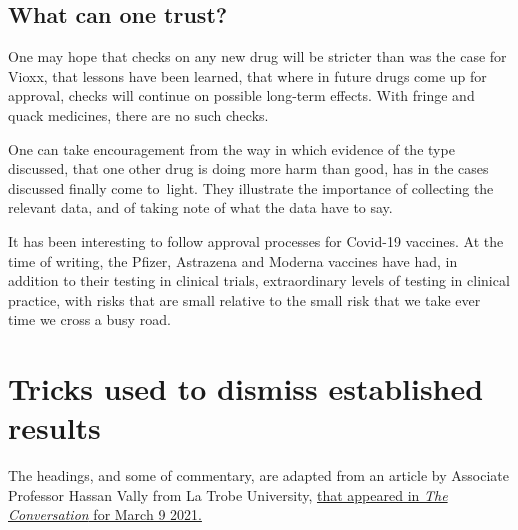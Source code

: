 \documentclass[
  10pt,
  b5paper]{book}
\begin{document}
\hypertarget{what-can-one-trust}{%
\subsection*{What can one trust?}\label{what-can-one-trust}}

One may hope that checks on any new drug will be
stricter than was the case for Vioxx, that lessons
have been learned, that where in future drugs come
up for approval, checks will continue on possible
long-term effects. With fringe and quack medicines,
there are no such checks.

One can take encouragement from the way in which
evidence of the type discussed, that one other drug
is doing more harm than good, has in the cases
discussed finally come to~light. They illustrate
the importance of collecting the relevant data, and
of taking note of what the data have to say.

It has been interesting to follow approval processes
for Covid-19 vaccines. At the time of writing, the
Pfizer, Astrazena and Moderna vaccines have had, in
addition to their testing in clinical trials,
extraordinary levels of testing in clinical practice,
with risks that are small relative to the small risk
that we take ever time we cross a busy road.

\hypertarget{tricks-used-to-dismiss-established-results}{%
\section{Tricks used to dismiss established results}\label{tricks-used-to-dismiss-established-results}}

The headings, and some of commentary, are adapted from an article by
Associate Professor Hassan Vally from La Trobe University,
\href{https://theconversation.com/5-ways-to-spot-if-someone-is-trying-to-mislead-you-when-it-comes-to-science-138814?utm_medium=email\&utm_campaign=Latest\%20from\%20The\%20Conversation\%20for\%20March\%209\%202021\%20-\%201883318379\&utm_content=Latest\%20from\%20The\%20Conversation\%20for\%20March\%209\%202021\%20-\%201883318379+CID_6009c8d7af2a01f376a88d0491598cfa\&utm_source=campaign_monitor\&utm_term=5\%20ways\%20to\%20spot\%20if\%20someone\%20is\%20trying\%20to\%20mislead\%20you\%20when\%20it\%20comes\%20to\%20science}{that appeared in \emph{The Conversation} for March 9 2021.}
\end{document}

